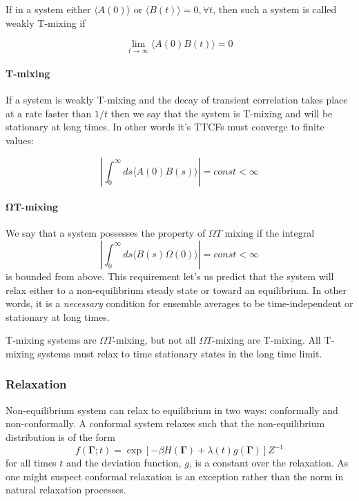 \documentclass[a4paper,12pt]{article}
\begin{document}
If in a system either $\langle A(0) \rangle $ or $ \langle B(t) \rangle = 0, \forall t $, then such a system is called weakly T-mixing if

\begin{equation}
  \lim_{t \to \infty} \langle A(0) B(t) \rangle = 0
\end{equation}

\paragraph{T-mixing}
If a system is weakly T-mixing and the decay of transient correlation takes place at a rate faster than $1/t$ then we say that the system is T-mixing and will be stationary at long times. In other words it's TTCFs must converge to finite values:

\begin{equation}
  \left| \int_0^{\infty} ds \langle A(0) B(s) \rangle \right| = const < \infty 
\end{equation}


\paragraph{$\bm{\Omega T}$-mixing}
We say that a system possesses the property of $\Omega T$ mixing if the integral
\begin{equation}
    \left| \int_0^{\infty} ds \langle B(s) \Omega(0) \rangle \right| = const < \infty
\end{equation}
is bounded from above. This requirement let's us predict that the system will relax either to a non-equilibrium steady state or toward an equilibrium. In other words, it is a \textit{necessary} condition for ensemble averages to be time-independent or stationary at long times.

T-mixing systems are $\Omega T$-mixing, but not all $\Omega T$-mixing are T-mixing. All T-mixing systems must relax to time stationary states in the long time limit.


\subsubsection{Relaxation}

Non-equilibrium system can relax to equilibrium in two ways: conformally and non-conformally.
A conformal system relaxes such that the non-equilibrium distribution is of the form
\begin{equation}
  f(\bm{\Gamma};t)=\exp[-\beta H(\bm{\Gamma})+\lambda(t) g(\bm{\Gamma})] Z^{-1}
\end{equation}
for all times $t$ and the deviation function, $g$, is a constant over the relaxation.
As one might suspect conformal relaxation is an exception rather than the norm in natural relaxation processes.
\end{document}
